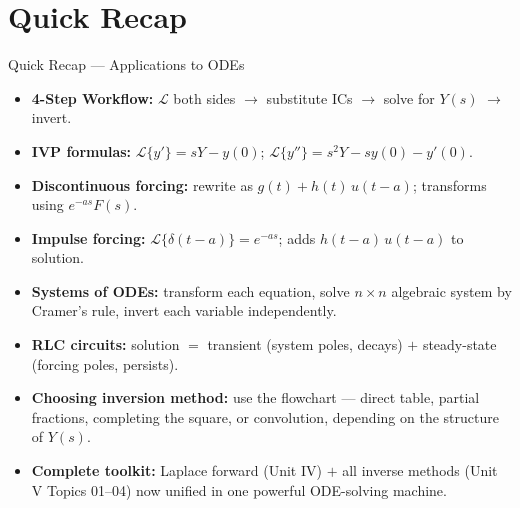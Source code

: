 \documentclass[12pt,a4paper]{article}
\begin{document}
\section{Quick Recap}

\begin{learnbox}{Quick Recap --- Applications to ODEs}
\begin{itemize}[nosep]
  \item \textbf{4-Step Workflow:} $\mathcal{L}$ both sides $\to$ substitute ICs $\to$ solve for $Y(s)$ $\to$ invert.
  \item \textbf{IVP formulas:} $\mathcal{L}\{y'\}=sY-y(0)$;\; $\mathcal{L}\{y''\}=s^2Y-sy(0)-y'(0)$.
  \item \textbf{Discontinuous forcing:} rewrite as $g(t)+h(t)\,u(t-a)$; transforms using $e^{-as}F(s)$.
  \item \textbf{Impulse forcing:} $\mathcal{L}\{\delta(t-a)\}=e^{-as}$; adds $h(t-a)\,u(t-a)$ to solution.
  \item \textbf{Systems of ODEs:} transform each equation, solve $n\times n$ algebraic system by Cramer's rule, invert each variable independently.
  \item \textbf{RLC circuits:} solution $=$ transient (system poles, decays) $+$ steady-state (forcing poles, persists).
  \item \textbf{Choosing inversion method:} use the flowchart --- direct table, partial fractions, completing the square, or convolution, depending on the structure of $Y(s)$.
  \item \textbf{Complete toolkit:} Laplace forward (Unit IV) $+$ all inverse methods (Unit V Topics 01--04) now unified in one powerful ODE-solving machine.
\end{itemize}
\end{learnbox}
\end{document}
